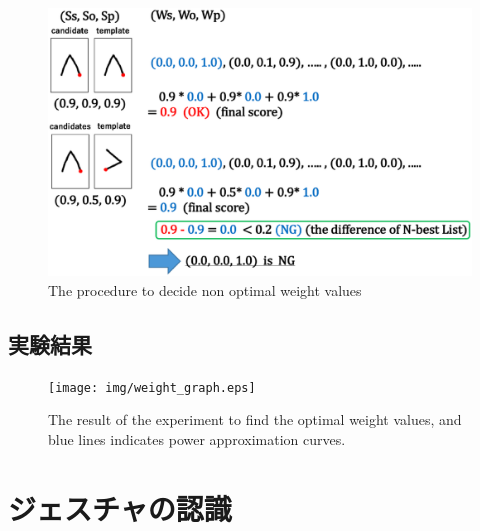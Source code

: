 \begin{figure} [h!]
	\begin{center}
		\includegraphics [width=0.8\hsize ]{img/weight_method2.eps}
	\end{center}
	\caption{The procedure to decide non optimal weight values}
	\label{fig:weight_method2}
\end{figure}

\subsection{実験結果}
\begin{figure} [t]
 \begin{center}
  \texttt{[image: img/weight\_graph.eps]}
  \caption{The result of the experiment to find the optimal weight values, and blue lines indicates power approximation curves.}
  \label{fig:weight_graph}
 \end{center}
\end{figure}

\section{ジェスチャの認識}


